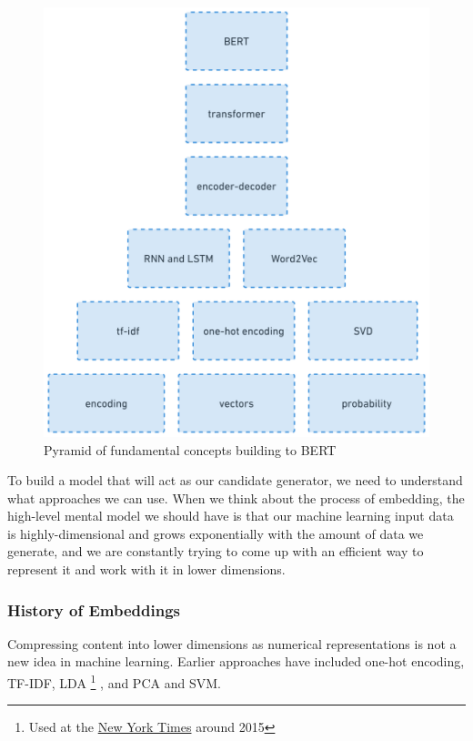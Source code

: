 \documentclass[11pt]{diazessay} %
\begin{document}
\begin{figure}[!ht]
\centering
\includegraphics[width=\textwidth]{figures/pyramid.png}
\caption{Pyramid of fundamental concepts building to BERT}
\end{figure}

To build a model that will act as our candidate generator, we need to understand what approaches we can use. When we think about the process of embedding, the high-level mental model we should have is that our machine learning input data is highly-dimensional and grows exponentially with the amount of data we generate, and we are constantly trying to come up with an efficient way to represent it and work with it in lower dimensions.

\subsubsection{History of Embeddings}
Compressing content into lower dimensions as numerical representations is not a new idea in machine learning. Earlier approaches have included one-hot encoding, TF-IDF, LDA \footnote{Used at the \href{https://archive.nytimes.com/open.blogs.nytimes.com/2015/08/11/building-the-next-new-york-times-recommendation-engine/}{New York Times} around 2015} , and PCA and SVM. 
\end{document}
